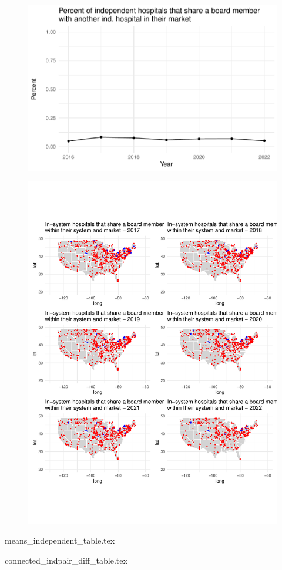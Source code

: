 \documentclass[12pt]{article}
\begin{document}
    \begin{figure}[ht!]
        \centering
        \includegraphics[width=\textwidth]{Objects/connected_independent_percent.pdf}
    \end{figure}
    

    \begin{figure}[ht!]
    \centering
        \includegraphics[width=\textwidth]{Objects/common_boards_independent_maps.pdf}
        \label{fig:outcomes_graph}
    \end{figure}
    

    {means_independent_table.tex}

    {connected_indpair_diff_table.tex}
    
\end{document}
